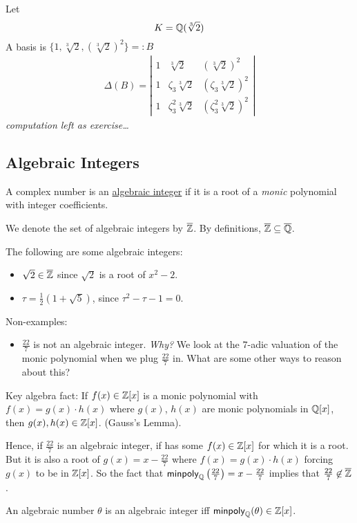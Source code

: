 \begin{example}
    Let
    \[K = \mathbb Q(\sqrt[3]{2})\]
    A basis is $\{1, \sqrt[3]{2}, (\sqrt[3]{2})^2\} =: B$
    \begin{align*}
        \Delta(B) = \left|\begin{array}{ccc}
                              1 & \sqrt[3]{2}          & (\sqrt[3]{2})^2          \\
                              1 & \zeta_3\sqrt[3]{2}   & (\zeta_3\sqrt[3]{2})^2   \\
                              1 & \zeta_3^2\sqrt[3]{2} & (\zeta_3^2\sqrt[3]{2})^2
                          \end{array}\right|
    \end{align*}
    \emph{computation left as exercise\dots}
\end{example}

\subsection{Algebraic Integers}
\begin{definition}
    A complex number is an \ul{algebraic integer} if it is a root of a \emph{monic} polynomial with integer coefficients.
\end{definition}

We denote the set of algebraic integers by $\overline{\mathbb Z}$. By definitions, $\overline{\mathbb Z}\subseteq\overline{\mathbb Q}$.

\begin{example}
    The following are some algebraic integers: 
    \begin{itemize}
        \item $\sqrt{2}\in\overline{\mathbb Z}$ since $\sqrt{2}$ is a root of $x^2 - 2$. 
        \item $\tau = \frac{1}{2}(1 + \sqrt{5})$, since $\tau^2 - \tau - 1 = 0$. 
    \end{itemize}
    Non-examples: 
    \begin{itemize}
        \item $\frac{22}{7}$ is not an algebraic integer. \emph{Why?} We look at the $7$-adic valuation of the monic polynomial when we plug $\frac{22}{7}$ in. What are some other ways to reason about this? 
    \end{itemize}
\end{example}
Key algebra fact: If $f(x)\in \mathbb Z[x]$ is a monic polynomial with $f(x) = g(x)\cdot h(x)$ where $g(x)$, $h(x)$ are monic polynomials in $\mathbb Q[x]$, then $g(x), h(x)\in \mathbb Z[x]$. (Gauss's Lemma). 

Hence, if $\frac{22}{7}$ is an algebraic integer, if has some $f(x)\in\mathbb Z[x]$ for which it is a root. But it is also a root of $g(x) = x - \frac{22}{7}$ where $f(x) = g(x)\cdot h(x)$ forcing $g(x)$ to be in $\mathbb Z[x]$. So the fact that $\operatorname{\mathsf{minpoly}}_\mathbb Q\left(\frac{22}{7}\right) = x - \frac{22}{7}$ implies that $\frac{22}{7}\not\in\overline{\mathbb Z}$. 

\begin{definition*}
    An algebraic number $\theta$ is an algebraic integer iff $\operatorname{\mathsf{minpoly}}_\mathbb Q(\theta)\in\mathbb Z[x]$. 
\end{definition*}